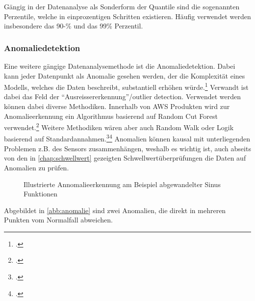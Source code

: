 Gängig in der Datenanalyse als Sonderform der Quantile sind die sogenannten Perzentile, welche in einprozentigen Schritten existieren. Häufig verwendet werden insbesondere das 90-\% und das 99\% Perzentil.

\subsubsection{Anomaliedetektion}
Eine weitere gängige Datenanalysemethode ist die Anomaliedetektion. 
Dabei kann jeder Datenpunkt als Anomalie gesehen werden, der die Komplexität eines Modells, welches die Daten beschreibt, substantiell erhöhen würde.\footcite[Vgl.][]{Guha.2016} Verwandt ist dabei das Feld der \enquote{Ausreissererkennung}/outlier detection. 
Verwendet werden können dabei diverse Methodiken. Innerhalb von \ac{AWS} Produkten wird zur Anomalieerkennung ein Algorithmus basierend auf Random Cut Forest verwendet.\footcite[Vgl.][1]{Guha.2016} Weitere Methodiken wären aber auch Random Walk oder Logik basierend auf Standardannahmen.\footcite[Vgl.][]{Moonesinghe.2006}\nzitat\footcite[Vgl.][]{Angiulli.2008} Anomalien können kausal mit unterliegenden Problemen z.B. des Sensors zusammenhängen, weshalb es wichtig ist, auch abseits von den in \autoref{chap:schwellwert} gezeigten Schwellwertüberprüfungen die Daten auf Anomalien zu prüfen.

\begin{figure}[H]
\centering
{}
\caption{Illustrierte Annomalieerkennung am Beispiel abgewandelter Sinus Funktionen}
\label{abb:anomalie}
\end{figure}

Abgebildet in \autoref{abb:anomalie} sind zwei Anomalien, die direkt in mehreren Punkten vom Normalfall abweichen.
